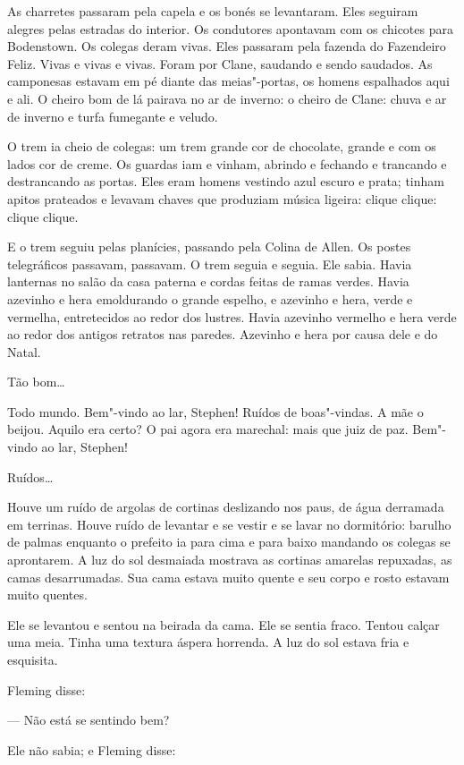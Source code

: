 As charretes passaram pela capela e os bonés se levantaram. Eles
seguiram alegres pelas estradas do interior. Os condutores apontavam
com os chicotes para Bodenstown. Os colegas deram vivas. Eles passaram
pela fazenda do Fazendeiro Feliz. Vivas e vivas e vivas. Foram por
Clane, saudando e sendo saudados. As camponesas estavam em pé diante
das meias"-portas, os homens espalhados aqui e ali. O cheiro bom de lá
pairava no ar de inverno: o cheiro de Clane: chuva e ar de inverno e
turfa fumegante e veludo.

O trem ia cheio de colegas: um trem grande cor de chocolate, grande e
com os lados cor de creme. Os guardas iam e vinham, abrindo e fechando
e trancando e destrancando as portas. Eles eram homens vestindo azul
escuro e prata; tinham apitos prateados e levavam chaves que produziam
música ligeira: clique clique: clique clique.

E o trem seguiu pelas planícies, passando pela Colina de Allen. Os
postes telegráficos passavam, passavam. O trem seguia e seguia. Ele
sabia. Havia lanternas no salão da casa paterna e cordas feitas de
ramas verdes. Havia azevinho e hera emoldurando o grande espelho, e
azevinho e hera, verde e vermelha, entretecidos ao redor dos lustres.
Havia azevinho vermelho e hera verde ao redor dos antigos retratos nas
paredes. Azevinho e hera por causa dele e do Natal.

Tão bom\ldots{}

Todo mundo. Bem"-vindo ao lar, Stephen! Ruídos de boas"-vindas. A mãe o
beijou. Aquilo era certo? O pai agora era marechal: mais que juiz de
paz. Bem"-vindo ao lar, Stephen!

Ruídos\ldots{}

Houve um ruído de argolas de cortinas deslizando nos paus, de água
derramada em terrinas. Houve ruído de levantar e se vestir e se lavar
no dormitório: barulho de palmas enquanto o prefeito ia para cima e
para baixo mandando os colegas se aprontarem. A luz do sol desmaiada
mostrava as cortinas amarelas repuxadas, as camas desarrumadas. Sua
cama estava muito quente e seu corpo e rosto estavam muito quentes.

Ele se levantou e sentou na beirada da cama. Ele se sentia fraco. Tentou
calçar uma meia. Tinha uma textura áspera horrenda. A luz do sol estava
fria e esquisita.

Fleming disse:

 --- Não está se sentindo bem?

Ele não sabia; e Fleming disse:

